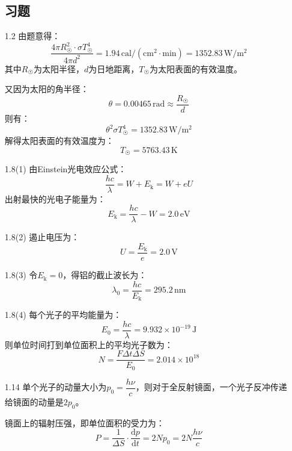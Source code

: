 \documentclass[a4paper,fontset=none]{ctexart}
\begin{document}
\begin{itemize}
        \subsection*{习题}

        \item[1.2]
        由题意得：
        \[
        \frac{4\pi R_{\astrosun}^2 \cdot \sigma T_{\astrosun}^4}{4\pi d^2} = 1.94\,\mathrm{cal/(cm^2 \cdot min)} = 1352.83\,\mathrm{W/m^2}
        \]
        其中$R_{\astrosun}$为太阳半径，$d$为日地距离，$T_{\astrosun}$为太阳表面的有效温度。

        又因为太阳的角半径：
        \[
        \theta = 0.00465\,\mathrm{rad} \approx \frac{R_{\astrosun}}{d}
        \]
        则有：
        \[
        \theta^2\sigma T_{\astrosun}^4 = 1352.83\,\mathrm{W/m^2}
        \]
        解得太阳表面的有效温度为：
        \[
        T_{\astrosun} = 5763.43\,\mathrm{K}
        \]

        \item[1.8(1)]
        由Einstein光电效应公式：
        \[
        \frac{hc}{\lambda} = W + E_\mathrm{k} = W + eU
        \]
        出射最快的光电子能量为：
        \[
        E_\mathrm{k} = \frac{hc}{\lambda} - W = 2.0\,\mathrm{eV}
        \]

        \item[1.8(2)]
        遏止电压为：
        \[
        U = \frac{E_\mathrm{k}}{e} = 2.0\,\mathrm{V}
        \]

        \item[1.8(3)]
        令$E_\mathrm{k} = 0$，得铝的截止波长为：
        \[
        \lambda_0 = \frac{hc}{E_\mathrm{k}} = 295.2\,\mathrm{nm}
        \]

        \item[1.8(4)]
        每个光子的平均能量为：
        \[
        E_0 = \frac{hc}{\lambda} = 9.932\times10^{-19}\,\mathrm{J}
        \]
        则单位时间打到单位面积上的平均光子数为：
        \[
        N = \frac{F\Delta t\Delta S}{E_0} = 2.014\times10^{18}
        \]

        \item[1.14]
        单个光子的动量大小为$p_0 = \dfrac{h\nu}{c}$，则对于全反射镜面，一个光子反冲传递给镜面的动量是$2p_0$。

        镜面上的辐射压强，即单位面积的受力为：
        \[
        P = \frac{1}{\Delta S}\cdot\frac{\mathrm{d}p}{\mathrm{d}t} = 2Np_0 = 2N\frac{h\nu}{c}
        \]


\end{itemize}
\end{document}
